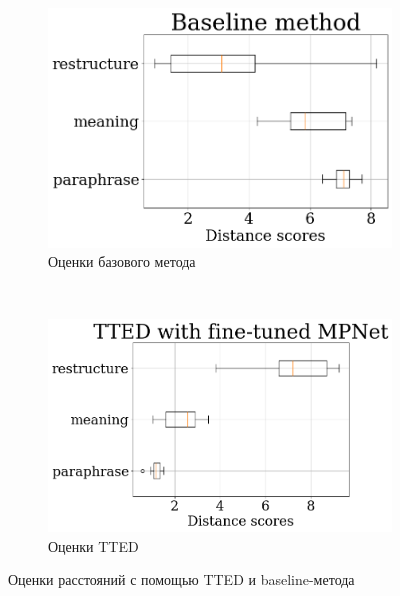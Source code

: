\documentclass[12pt]{article}
\begin{document}
\begin{figure}[h]
\begin{subfigure}{.45\textwidth}
    \centering
    \includegraphics[width=\linewidth]{img/baseline_results.png}
    \caption{Оценки базового метода}
    \label{fig:baseline}
\end{subfigure}~
\begin{subfigure}{.5\textwidth}
    \centering
    \includegraphics[width=\linewidth]{img/paraphrase_mpnet_results.png}
    \caption{Оценки TTED}
    \label{fig:results}
\end{subfigure}
\caption{Оценки расстояний с помощью TTED и baseline-метода}
\end{figure}
\end{document}
